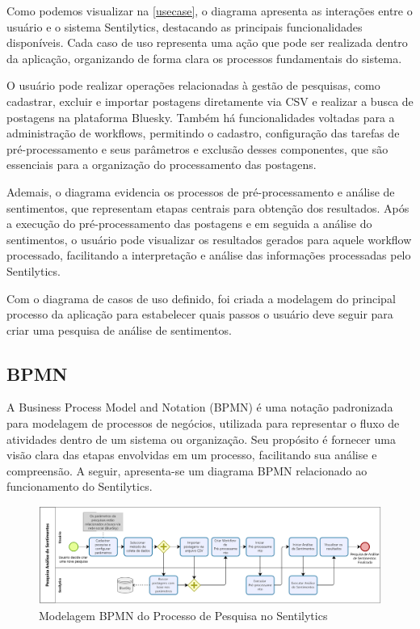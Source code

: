 \documentclass[
	12pt,				%
	oneside,			%
	a4paper,			%
	english,			%
	french,				%
	spanish,			%
	brazil				%
	]{abntex2}
\begin{document}
Como podemos visualizar na \autoref{usecase}, o diagrama apresenta as
interações entre o usuário e o sistema Sentilytics, destacando as
principais funcionalidades disponíveis. Cada caso de uso representa uma
ação que pode ser realizada dentro da aplicação, organizando de forma
clara os processos fundamentais do sistema.

O usuário pode realizar operações relacionadas à gestão de pesquisas,
como cadastrar, excluir e importar postagens diretamente via CSV e
realizar a busca de postagens na plataforma Bluesky. Também há
funcionalidades voltadas para a administração de workflows, permitindo o
cadastro, configuração das tarefas de pré-processamento e seus
parâmetros e exclusão desses componentes, que são essenciais para a
organização do processamento das postagens.

Ademais, o diagrama evidencia os processos de pré-processamento e
análise de sentimentos, que representam etapas centrais para obtenção
dos resultados. Após a execução do pré-processamento das postagens e em
seguida a análise do sentimentos, o usuário pode visualizar os
resultados gerados para aquele workflow processado, facilitando a
interpretação e análise das informações processadas pelo Sentilytics.

Com o diagrama de casos de uso definido, foi criada a modelagem do
principal processo da aplicação para estabelecer quais passos o usuário
deve seguir para criar uma pesquisa de análise de sentimentos.

\hypertarget{bpmn}{%
\subsection{BPMN}\label{bpmn}}

A Business Process Model and Notation (BPMN) é uma notação padronizada
para modelagem de processos de negócios, utilizada para representar o
fluxo de atividades dentro de um sistema ou organização. Seu propósito é
fornecer uma visão clara das etapas envolvidas em um processo,
facilitando sua análise e compreensão. A seguir, apresenta-se um
diagrama BPMN relacionado ao funcionamento do Sentilytics.

\begin{figure}[htbp]
\hypertarget{bpmn_pesquisa}{%
\caption{Modelagem BPMN do Processo de Pesquisa no Sentilytics}\label{bpmn_pesquisa}
\begin{center}
\includegraphics[scale=0.3]{imagens/sentilytics/pesquisa_sentimentos.png}
\end{center}
}
\end{figure}
\end{document}
